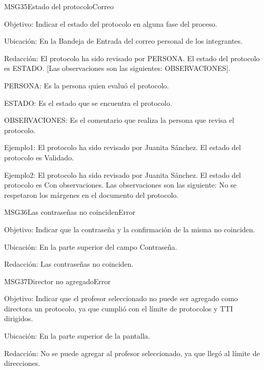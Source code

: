 \begin{mensaje}{MSG35}{Estado del protocolo}{Correo}
	\item[Objetivo:] Indicar el estado del protocolo en alguna fase del proceso.
	\item[Ubicación:] En la Bandeja de Entrada del correo personal de los integrantes.
	\item[Redacción:] El protocolo ha sido revisado por PERSONA. El estado del protocolo es ESTADO. [Las observaciones son las siguientes: OBSERVACIONES].
	\begin{Citemize}
		\item PERSONA: Es la persona quien evaluó el protocolo.
		\item ESTADO: Es el estado que se encuentra el protocolo.
		\item OBSERVACIONES: Es el comentario que realiza la persona que revisa el protocolo.
	\end{Citemize}
	\item[Ejemplo1:] El protocolo ha sido revisado por Juanita Sánchez. El estado del protocolo es Validado.
	\item[Ejemplo2:] El protocolo ha sido revisado por Juanita Sánchez. El estado del protocolo es Con observaciones. Las observaciones son las siguiente: No se respetaron los márgenes en el documento del protocolo.
\end{mensaje}

\begin{mensaje}{MSG36}{Las contraseñas no coinciden}{Error}
	\item[Objetivo:] Indicar que la contraseña y la confirmación de la misma no coinciden.
	\item[Ubicación:] En la parte superior del campo Contraseña.
	\item[Redacción:] Las contraseñas no coinciden.
\end{mensaje}

\begin{mensaje}{MSG37}{Director no agregado}{Error}
	\item[Objetivo:] Indicar que el profesor seleccionado no puede ser agregado como directora un protocolo, ya que cumplió con el límite de protocolos y TTI dirigidos.
	\item[Ubicación:] En la parte superior de la pantalla.
	\item[Redacción:] No se puede agregar al profesor seleccionado, ya que llegó al límite de direcciones.
\end{mensaje}

